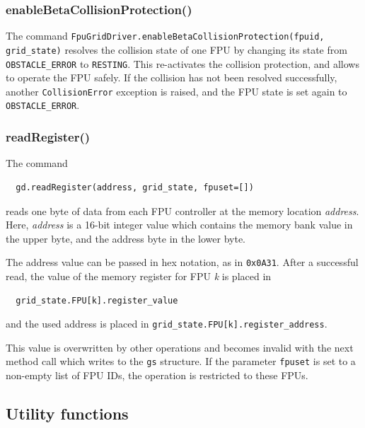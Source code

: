 \documentclass[11pt,a4paper]{report}
\begin{document}
\subsubsection{enableBetaCollisionProtection()}

The command \texttt{FpuGridDriver.enableBetaCollisionProtection(fpuid,
  grid\_state)} resolves the collision state of one FPU by changing
its state from \texttt{OBSTACLE\_ERROR} to \texttt{RESTING}.  This
re-activates the collision protection, and allows to operate the FPU
safely. If the collision has not been resolved successfully, another
\texttt{CollisionError} exception is raised, and the FPU state is set
again to \texttt{OBSTACLE\_ERROR}.

\subsubsection{readRegister()}
\label{sec:readregister}

The command

\begin{verbatim}
  gd.readRegister(address, grid_state, fpuset=[])
\end{verbatim}
reads one byte of data from each FPU controller
at the memory location \emph{address}. Here,
\emph{address} is a 16-bit integer value
which contains the memory bank value in the
upper byte, and the address byte in the lower byte.

The address value can be passed in hex notation,
as in \texttt{0x0A31}. After a successful read,
the value of the memory register for FPU \emph{k}
is placed in

\begin{verbatim}
  grid_state.FPU[k].register_value
\end{verbatim}
and the used address is placed in
\verb+grid_state.FPU[k].register_address+.


This value is overwritten by other operations and becomes invalid with
the next method call which writes to the \texttt{gs} structure.  If
the parameter \texttt{fpuset} is set to a non-empty list of FPU IDs,
the operation is restricted to these FPUs.


\subsection{Utility functions}
\end{document}
